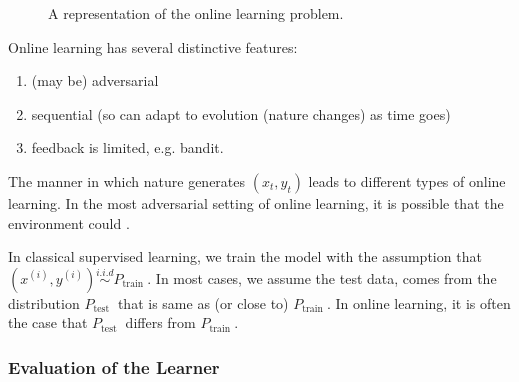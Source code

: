 \documentclass{article}
\begin{document}
\begin{defa}
\begin{figure}

\caption{A representation of the online learning problem.}\label{fig:online}
\end{figure}
\end{defa}
Online learning has several distinctive features:
\begin{enumerate}
    \item (may be) adversarial
    \item sequential (so can adapt to evolution (nature changes) as time goes)
    \item feedback is limited, e.g. bandit.
\end{enumerate}
\begin{rema}
The manner in which nature generates $\left(x_{t}, y_{t}\right)$ leads to different types of online learning. In the most adversarial setting of online learning, it is possible that the environment could .
\end{rema}
\begin{rema}
In classical supervised learning, we train the model with the assumption that $\left(x^{(i)}, y^{(i)}\right) \stackrel{i . i . d}{\sim} P_{\text {train }}$. In most cases, we assume the test data, comes from the distribution $P_{\text {test }}$ that is same as (or  close to) $P_{\text {train }}$. In online learning, it is often the case that $P_{\text {test }}$ differs from $P_{\text {train }}$.
\end{rema}
\subsubsection{Evaluation of the Learner}
\end{document}
